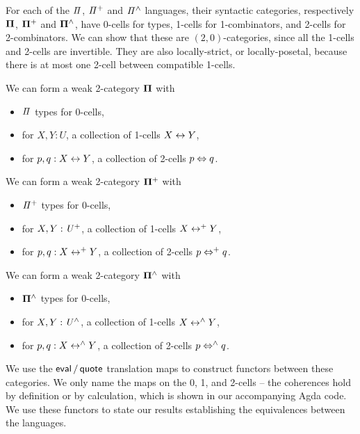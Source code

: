 For each of the $\mathit{\Pi}$, $\mathit{{\Pi}^{+}}$ and $\mathit{{\Pi}^{\wedge}}$ languages, their syntactic categories, respectively $\mathbf{\Pi}$,
$\mathbf{\Pi^{+}}$ and $\mathbf{\Pi^{\wedge}}$, have 0-cells for types, 1-cells for 1-combinators, and 2-cells for 2-combinators. We can
show that these are $(2,0)$-categories, since all the 1-cells and 2-cells are invertible. They are also locally-strict,
or locally-posetal, because there is at most one 2-cell between compatible 1-cells.

\begin{toappendix}
  \begin{proposition}
    We can form a weak 2-category $\mathbf{\Pi}$ with
    \begin{itemize}
      \item $\mathit{\Pi}$ types for 0-cells,
      \item for $X, Y : U$, a collection of 1-cells $X \mathrel{\leftrightarrow} Y$,
      \item for $p, q : X \mathrel{\leftrightarrow} Y$, a collection of 2-cells $p \mathrel{\Leftrightarrow} q$.
    \end{itemize}
  \end{proposition}

  \begin{proposition}
    We can form a weak 2-category $\mathbf{\Pi^{+}}$ with
    \begin{itemize}
      \item $\mathit{{\Pi}^{+}}$ types for 0-cells,
      \item for $X, Y : \mathit{U}^{+}$, a collection of 1-cells $X \mathrel{\leftrightarrow^{+}} Y$,
      \item for $p, q : X \mathrel{\leftrightarrow^{+}} Y$, a collection of 2-cells $p \mathrel{\Leftrightarrow^{+}} q$.
    \end{itemize}
  \end{proposition}

  \begin{proposition}
    We can form a weak 2-category $\mathbf{\Pi^{\wedge}}$ with
    \begin{itemize}
      \item $\mathbf{\Pi^{\wedge}}$ types for 0-cells,
      \item for $X, Y : \mathit{{U}^{\wedge}}$, a collection of 1-cells $X \mathrel{\leftrightarrow^{\wedge}} Y$,
      \item for $p, q : X \mathrel{\leftrightarrow^{\wedge}} Y$, a collection of 2-cells $p \mathrel{\Leftrightarrow^{\wedge}} q$.
    \end{itemize}
  \end{proposition}
\end{toappendix}

We use the $\evalt/\quotet$ translation maps to construct functors between these categories. We only name the maps on
the 0, 1, and 2-cells -- the coherences hold by definition or by calculation, which is shown in our accompanying Agda
code. We use these functors to state our results establishing the equivalences between the languages.


